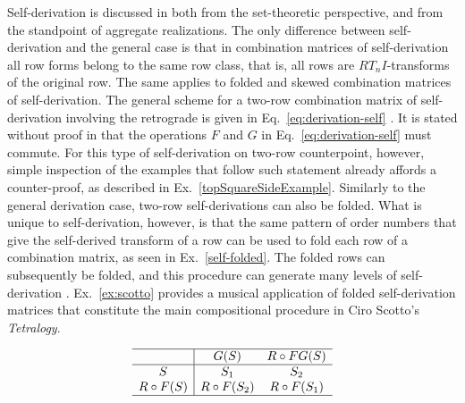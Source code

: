 Self-derivation is discussed in \cite[217, 226]{Starr1984} both from the set-theoretic perspective, and from the standpoint of aggregate realizations. The only difference between self-derivation and the general case is that in combination matrices of self-derivation all row forms belong to the same row class, that is, all rows are $RT_nI$-transforms of the original row. The same applies to folded and skewed combination matrices of self-derivation. The general scheme for a two-row combination matrix of self-derivation involving the retrograde is given in Eq.~\ref{eq:derivation-self} \cite[219]{Starr1984}. It is stated without proof in \cite[217]{Starr1984} that the operations $F$ and $G$ in Eq.~\ref{eq:derivation-self} must commute. For this type of self-derivation on two-row counterpoint, however, simple inspection of the examples that follow such statement already affords a counter-proof, as described in Ex.~\ref{topSquareSideExample}. Similarly to the general derivation case, two-row self-derivations can also be folded. What is unique to self-derivation, however, is that the same pattern of order numbers that give the self-derived transform of a row can be used to fold each row of a combination matrix, as seen in Ex.~\ref{self-folded}. The folded rows can subsequently be folded, and this procedure can generate many levels of self-derivation \cite[221]{Starr1984}. Ex.~\ref{ex:scotto} provides a musical application of folded self-derivation matrices that constitute the main compositional procedure in Ciro Scotto's \emph{Tetralogy}.

\begin{equation}
\begin{array}{c|cc}
	\hline
    & G(S) & R \circ FG(S) \\
    \hline
    S & S_1 & S_2 \\
    R \circ F(S) & R \circ F(S_2) & R \circ F(S_1) \\
    \hline
\end{array}
\label{eq:derivation-self}
\end{equation}

\vspace{12pt}

